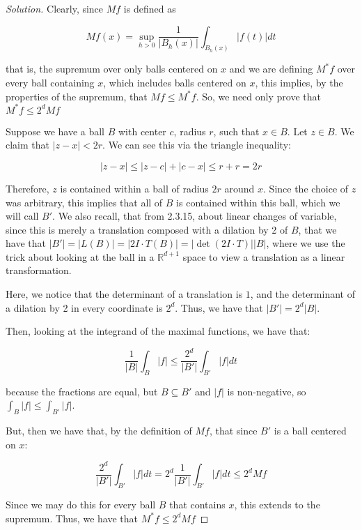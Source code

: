 \documentclass[10pt]{article}
\begin{document}
\begin{proof}[Solution]

Clearly, since $Mf$ is defined as

$$Mf(x) =  \sup_{ h > 0} \frac{1}{|B_h(x)|} \int_{B_h(x)} |f(t)| dt $$

that is, the supremum over only balls centered on $x$ and we are defining $M^*f$ over every ball containing $x$, which includes balls centered on $x$, this implies, by the properties of the supremum, that $Mf \leq M^*f$. So, we need only prove that $M^*f \leq 2^dMf$

Suppose we have a ball $B$ with center $c$, radius $r$, such that $x \in B$. Let $z \in B$. We claim that $| z - x| < 2r$. We can see this via the triangle inequality:

$$ | z- x| \leq |z - c| + | c - x| \leq r + r = 2r $$

Therefore, $z$ is contained within a ball of radius $2r$ around $x$. Since the choice of $z$ was arbitrary, this implies that all of $B$ is contained within this ball, which we will call $B'$. We also recall, that from 2.3.15, about linear changes of variable, since this is merely a translation composed with a dilation by 2 of $B$, that we have that $|B'| = |L(B)| = |2I \cdot T (B) | = |\det(2I \cdot T)| |B|$, where we use the trick about looking at the ball in a $\mathbb{R}^{d+1}$ space to view a translation as a linear transformation.

Here, we notice that the determinant of a translation is $1$, and the determinant of a dilation by 2 in every coordinate is $2^d$. Thus, we have that $|B'| = 2^d|B|$.

Then, looking at the integrand of the maximal functions, we have that:

$$ \frac{1}{|B|} \int_B |f| \leq \frac{2^d}{|B'|} \int_{B'} |f| dt $$

because the fractions are equal, but $B \subseteq B'$ and $|f|$ is non-negative, so $\int_B |f| \leq \int_{B'} |f|$.

But, then we have that, by the definition of $Mf$, that since $B'$ is a ball centered on $x$:

$$ \frac{2^d}{|B'|} \int_{B'} |f| dt = 2^d \frac{1}{|B'|} \int_{B'} |f| dt \leq 2^d Mf $$

Since we may do this for every ball $B$ that contains $x$, this extends to the supremum. Thus, we have that $M^*f \leq 2^d Mf$
\end{proof}
\end{document}
